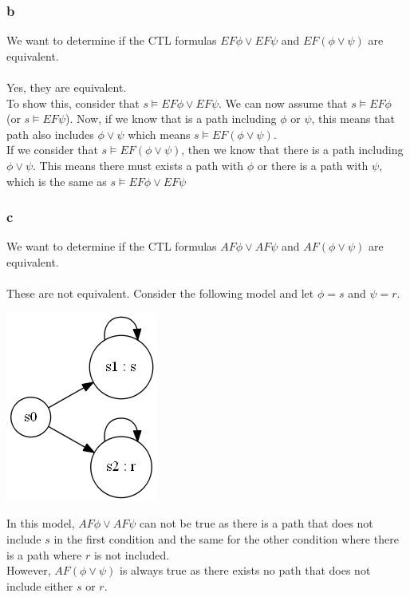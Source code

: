 \documentclass[12pt]{article}
\begin{document}
\subsubsection*{b}
We want to determine if the CTL formulas $EF\phi\lor EF\psi$ and $EF(\phi\lor\psi)$ are equivalent.\\
\\
Yes, they are equivalent. \\
To show this, consider that $s\models EF\phi \lor EF\psi$. We can now assume that $s\models EF\phi$ (or $s\models EF\psi$). Now, if we know that is a path including $\phi$ or $\psi$, this means that path also includes $\phi\lor\psi$ which means $s\models EF(\phi\lor\psi)$.\\
If we consider that $s\models EF(\phi\lor\psi)$, then we know that there is a path including $\phi\lor\psi$. This means there must exists a path with $\phi$ or there is a path with $\psi$, which is the same as $s\models EF\phi \lor EF\psi$

\newpage
\subsubsection*{c}
We want to determine if the CTL formulas $AF\phi\lor AF\psi$ and $AF(\phi\lor\psi)$ are equivalent.\\
\\
These are not equivalent. Consider the following model and let $\phi=s$ and $\psi=r$.
\begin{center}
\includegraphics[scale=0.75]{graph2}
\end{center}
In this model, $AF\phi\lor AF\psi$ can not be true as there is a path that does not include $s$ in the first condition and the same for the other condition where there is a path where $r$ is not included.\\
However, $AF(\phi\lor\psi)$ is always true as there exists no path that does not include either $s$ or $r$.
\end{document}
